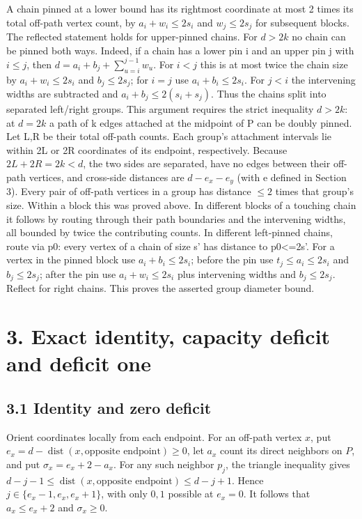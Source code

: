 \documentclass[
  11pt,
]{article}
\begin{document}
A chain pinned at a lower bound has its rightmost coordinate at most 2
times its total off-path vertex count, by \(a_{i}+w_{i}\le 2s_{i}\) and
\(w_{j}\le 2s_{j}\) for subsequent blocks. The reflected statement holds
for upper-pinned chains. For \(d>2k\) no chain can be pinned both ways.
Indeed, if a chain has a lower pin i and an upper pin j with \(i\le j\),
then \(d=a_i+b_j+\sum_{u=i}^{j-1}w_u\). For \(i<j\) this is at most
twice the chain size by \(a_{i}+w_{i}\le 2s_{i}\) and
\(b_{j}\le 2s_{j}\); for \(i=j\) use \(a_{i}+b_{i}\le 2s_{i}\). For
\(j<i\) the intervening widths are subtracted and
\(a_{i}+b_{j}\le 2(s_{i}+s_{j})\). Thus the chains split into separated
left/right groups. This argument requires the strict inequality
\(d>2k\): at \(d=2k\) a path of k edges attached at the midpoint of P
can be doubly pinned. Let L,R be their total off-path counts. Each
group's attachment intervals lie within 2L or 2R coordinates of its
endpoint, respectively. Because \(2L+2R=2k<d\), the two sides are
separated, have no edges between their off-path vertices, and cross-side
distances are \(d-e_{x}-e_{y}\) (with e defined in Section 3). Every
pair of off-path vertices in a group has distance \(\le 2\) times that
group's size. Within a block this was proved above. In different blocks
of a touching chain it follows by routing through their path boundaries
and the intervening widths, all bounded by twice the contributing
counts. In different left-pinned chains, route via p0: every vertex of a
chain of size s' has distance to p0\textless=2s'. For a vertex in the
pinned block use \(a_{i}+b_{i}\le 2s_{i}\); before the pin use
\(t_{j}\le a_{i}\le 2s_{i}\) and \(b_{j}\le 2s_{j}\); after the pin use
\(a_{i}+w_{i}\le 2s_{i}\) plus intervening widths and
\(b_{j}\le 2s_{j}\). Reflect for right chains. This proves the asserted
group diameter bound.

\section{3. Exact identity, capacity deficit and deficit
one}\label{exact-identity-capacity-deficit-and-deficit-one}

\subsection{3.1 Identity and zero
deficit}\label{identity-and-zero-deficit}

Orient coordinates locally from each endpoint. For an off-path vertex
\(x\), put
\(e_x=d-\operatorname{dist}(x,\text{opposite endpoint})\ge0\), let
\(a_x\) count its direct neighbors on \(P\), and put
\(\sigma_x=e_x+2-a_x\). For any such neighbor \(p_j\), the triangle
inequality gives
\(d-j-1\le\operatorname{dist}(x,\text{opposite endpoint})\le d-j+1\).
Hence \(j\in\{e_x-1,e_x,e_x+1\}\), with only \(0,1\) possible at
\(e_x=0\). It follows that \(a_x\le e_x+2\) and \(\sigma_x\ge0\).
\end{document}

